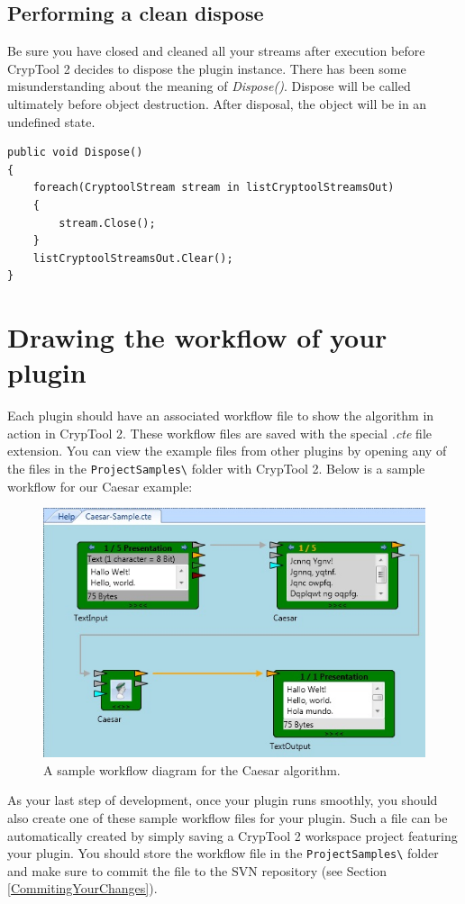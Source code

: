 \subsection{Performing a clean dispose}
\label{sec:PerformingACleanDispose}

Be sure you have closed and cleaned all your streams after execution before CrypTool 2 decides to dispose the plugin instance. There has been some misunderstanding about the meaning of \textit{Dispose()}. Dispose will be called ultimately before object destruction. After disposal, the object will be in an undefined state.

\begin{lstlisting}
public void Dispose()
{
	foreach(CryptoolStream stream in listCryptoolStreamsOut)
	{
		stream.Close();
	}
	listCryptoolStreamsOut.Clear();
}
\end{lstlisting}

\section{Drawing the workflow of your plugin}
\label{DrawingTheWorkfloweOfYourPlugin}

Each plugin should have an associated workflow file to show the algorithm in action in CrypTool 2. These workflow files are saved with the special \textit{.cte} file extension. You can view the example files from other plugins by opening any of the files in the \texttt{ProjectSamples\textbackslash} folder with CrypTool 2. Below is a sample workflow for our Caesar example:

\begin{figure}[h]
	\centering
		\includegraphics{figures/sample.jpg}
	\caption{A sample workflow diagram for the Caesar algorithm.}
	\label{fig:sample}
\end{figure}

As your last step of development, once your plugin runs smoothly, you should also create one of these sample workflow files for your plugin. Such a file can be automatically created by simply saving a CrypTool 2 workspace project featuring your plugin. You should store the workflow file in the \texttt{ProjectSamples\textbackslash} folder and make sure to commit the file to the SVN repository (see Section \ref{CommitingYourChanges}).